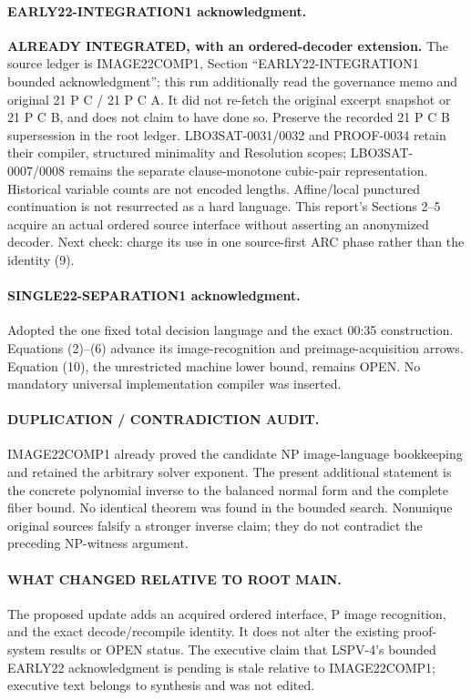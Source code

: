 \documentclass[11pt]{article}
\begin{document}
\paragraph{EARLY22-INTEGRATION1 acknowledgment.}
\textbf{ALREADY INTEGRATED, with an ordered-decoder extension.} The source
ledger is IMAGE22COMP1, Section ``EARLY22-INTEGRATION1 bounded acknowledgment'';
this run additionally read the governance memo and original 21 P C / 21 P C A.
It did not re-fetch the original excerpt snapshot or 21 P C B, and does not
claim to have done so. Preserve the recorded 21 P C B supersession in the
root ledger. LBO3SAT-0031/0032 and PROOF-0034 retain their compiler, structured
minimality and Resolution scopes; LBO3SAT-0007/0008 remains the separate
clause-monotone cubic-pair representation. Historical variable counts are
not encoded lengths. Affine/local punctured continuation is not resurrected
as a hard language. This report's Sections 2--5 acquire an actual ordered
source interface without asserting an anonymized decoder. Next check: charge
its use in one source-first ARC phase rather than the identity (9).

\paragraph{SINGLE22-SEPARATION1 acknowledgment.}
Adopted the one fixed total decision language and the exact 00:35 construction.
Equations (2)--(6) advance its image-recognition and preimage-acquisition
arrows. Equation (10), the unrestricted machine lower bound, remains OPEN.
No mandatory universal implementation compiler was inserted.

\paragraph{DUPLICATION / CONTRADICTION AUDIT.}
IMAGE22COMP1 already proved the candidate NP image-language bookkeeping and
retained the arbitrary solver exponent. The present additional statement is
the concrete polynomial inverse to the balanced normal form and the complete
fiber bound. No identical theorem was found in the bounded search. Nonunique
original sources falsify a stronger inverse claim; they do not contradict the
preceding NP-witness argument.

\paragraph{WHAT CHANGED RELATIVE TO ROOT MAIN.}
The proposed update adds an acquired ordered interface, P image recognition,
and the exact decode/recompile identity. It does not alter the existing
proof-system results or OPEN status. The executive claim that LSPV-4's bounded
EARLY22 acknowledgment is pending is stale relative to IMAGE22COMP1; executive
text belongs to synthesis and was not edited.
\end{document}
